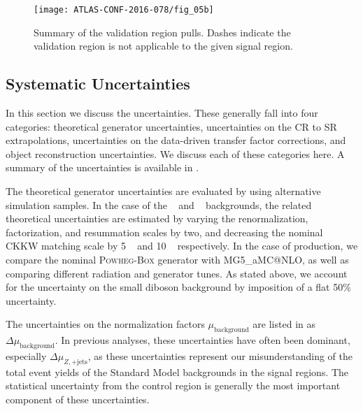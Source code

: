 \begin{figure}[tbp]
\caption{Summary of the validation region pulls.
Dashes indicate the validation region is not applicable to the given signal region.} \label{fig:vr_summary}
\texttt{[image: ATLAS-CONF-2016-078/fig\_05b]}
\end{figure}

\subsection{Systematic Uncertainties}

In this section we discuss the uncertainties.
These generally fall into four categories: theoretical generator uncertainties, uncertainties on the CR to SR extrapolations, uncertainties on the data-driven transfer factor corrections, and object reconstruction uncertainties.
We discuss each of these categories here.
A summary of the uncertainties is available in .


The theoretical generator uncertainties are evaluated by using alternative simulation samples.
In the case of the \zjets~ and \wjets~ backgrounds, the related theoretical uncertainties are estimated by varying the renormalization, factorization, and resummation scales by two, and decreasing the nominal CKKW matching scale by 5 \GeV~ and 10 \GeV~ respectively.
In the case of \ttbar production, we compare the nominal \textsc{Powheg-Box} generator with MG5\_aMC@NLO, as well as comparing different radiation and generator tunes.
As stated above, we account for the uncertainty on the small diboson background by imposition of a flat 50\% uncertainty.

The uncertainties on the normalization factors $\mu_{\text{background}}$ are listed in  as $\Delta\mu_{\text{background}}$.
In previous analyses, these uncertainties have often been dominant, especially $\Delta\mu_{Z,\mathrm{+jets}}$, as these uncertainties represent our misunderstanding of the total event yields of the Standard Model backgrounds in the signal regions.
The statistical uncertainty from the control region is generally the most important component of these uncertainties.

